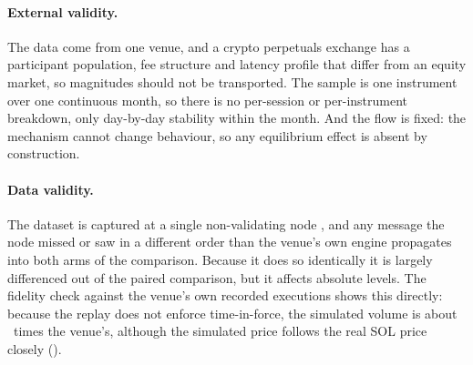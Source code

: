 \paragraph{External validity.} The data come from one venue, and a crypto
perpetuals exchange has a participant population, fee structure and latency
profile that differ from an equity market, so magnitudes should not be
transported. The sample is one instrument over one continuous month, so
there is no per-session or per-instrument breakdown, only day-by-day
stability within the month. And the flow is fixed: the mechanism cannot
change behaviour, so any equilibrium effect is absent by construction.

\paragraph{Data validity.} The dataset is captured at a single
non-validating node \citep{albers2026openbook}, and any message the node
missed or saw in a different order than the venue's own engine propagates
into both arms of the comparison. Because it does so identically it is
largely differenced out of the paired comparison, but it affects absolute
levels. The fidelity check against the venue's own recorded executions shows
this directly: because the replay does not enforce time-in-force, the simulated
volume is about \VerCdaOverVenue\ times the venue's, although the simulated
price follows the real SOL price closely ().
